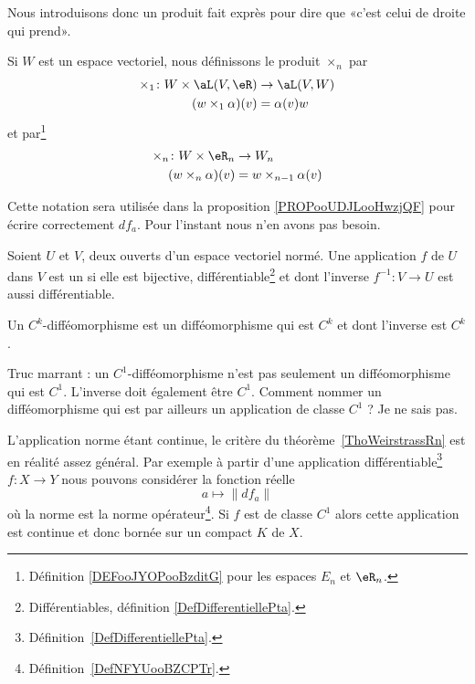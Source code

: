 Nous introduisons donc un produit fait exprès pour dire que «c'est celui de droite qui prend».
\begin{definition}       \label{DEFooLULCooYjBEaZ}
	Si \( W\) est un espace vectoriel, nous définissons le produit \( \times_n\) par
	\begin{equation}
		\begin{aligned}
			\times_1\colon W\times \aL(V,\eR) & \to \aL(V,W) \\
			(w\times_1\alpha)(v)              & =\alpha(v)w
		\end{aligned}
	\end{equation}
	et par\footnote{Définition \ref{DEFooJYOPooBzditG} pour les espaces \( E_n\) et \( \eR_n\).}
	\begin{equation}
		\begin{aligned}
			\times_n\colon W\times \eR_n & \to W_n                  \\
			(w\times_n\alpha)(v)         & =w\times_{n-1} \alpha(v)
		\end{aligned}
	\end{equation}
\end{definition}
Cette notation sera utilisée dans la proposition \ref{PROPooUDJLooHwzjQF} pour écrire correctement \( df_a\). Pour l'instant nous n'en avons pas besoin.



\begin{definition}[difféomorphisme]      \label{DefAQIQooYqZdya}
	Soient \( U\) et \( V\), deux ouverts d'un espace vectoriel normé. Une application \( f\) de \( U\) dans \( V\) est un  si elle est bijective, différentiable\footnote{Différentiables, définition \ref{DefDifferentiellePta}.} et dont l'inverse \( f^{-1}:V\to U \) est aussi différentiable.

	Un \( C^k\)-difféomorphisme est un difféomorphisme qui est \( C^k\) et dont l'inverse est \( C^k\).
\end{definition}

\begin{normaltext}
	Truc marrant : un \( C^1\)-difféomorphisme n'est pas seulement un difféomorphisme qui est \( C^1\). L'inverse doit également être \( C^1\). Comment nommer un difféomorphisme qui est par ailleurs un application de classe \( C^1\) ? Je ne sais pas.
\end{normaltext}

\begin{remark}      \label{RemATQVooDnZBbs}
	L'application norme étant continue, le critère du théorème~\ref{ThoWeirstrassRn} est en réalité assez général. Par exemple à partir d'une application différentiable\footnote{Définition~\ref{DefDifferentiellePta}.} \( f\colon X\to Y\)  nous pouvons considérer la fonction réelle
	\begin{equation}
		a\mapsto \|  df_a   \|
	\end{equation}
	où la norme est la norme opérateur\footnote{Définition~\ref{DefNFYUooBZCPTr}.}. Si \( f\) est de classe \( C^1\) alors cette application est continue et donc bornée sur un compact \( K\) de \( X\).
\end{remark}

